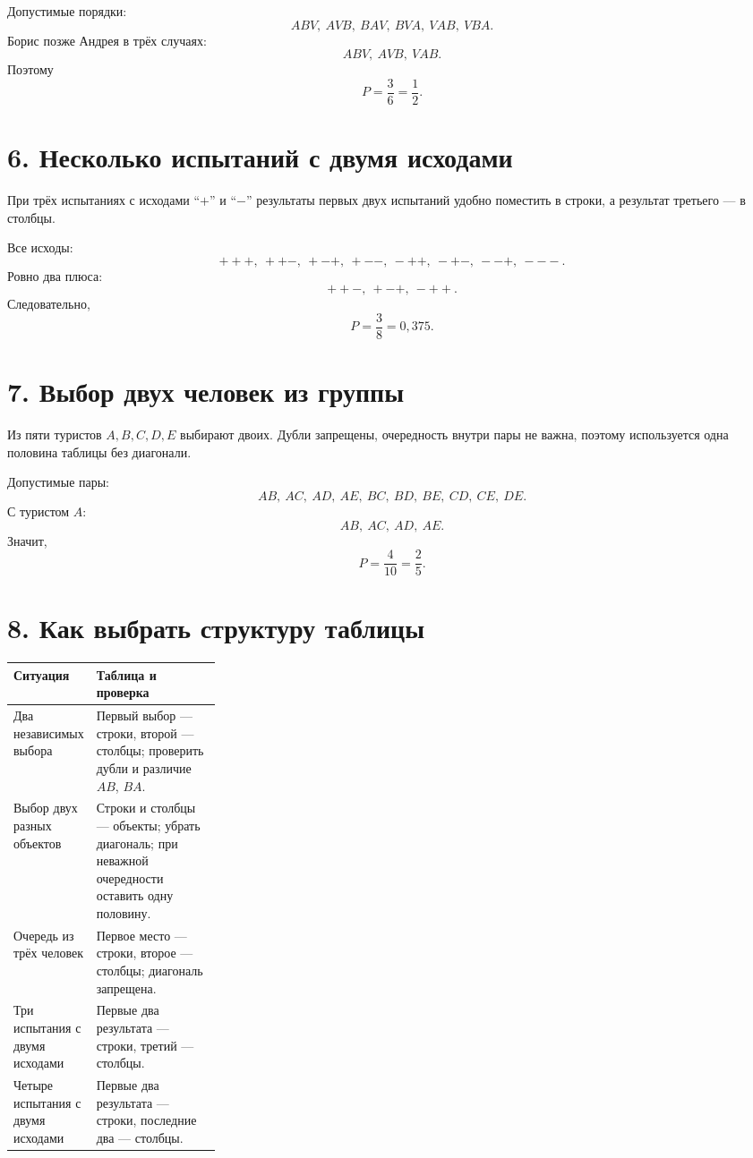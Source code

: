 \documentclass[a4paper,12pt]{article}
\begin{document}
Допустимые порядки:
\[
ABV,\ AVB,\ BAV,\ BVA,\ VAB,\ VBA.
\]
Борис позже Андрея в трёх случаях:
\[
ABV,\ AVB,\ VAB.
\]
Поэтому
\[
P=\frac36=\frac12.
\]

\section*{6. Несколько испытаний с двумя исходами}

При трёх испытаниях с исходами ``$+$'' и ``$-$'' результаты первых двух
испытаний удобно поместить в строки, а результат третьего --- в столбцы.

Все исходы:
\[
+++,\ ++-,\ +-+,\ +--,\ -++,\ -+-,\ --+,\ ---.
\]
Ровно два плюса:
\[
++-,\ +-+,\ -++.
\]
Следовательно,
\[
P=\frac38=0{,}375.
\]

\section*{7. Выбор двух человек из группы}

Из пяти туристов $A,B,C,D,E$ выбирают двоих.
Дубли запрещены, очередность внутри пары не важна, поэтому используется одна
половина таблицы без диагонали.

Допустимые пары:
\[
AB,\ AC,\ AD,\ AE,\ BC,\ BD,\ BE,\ CD,\ CE,\ DE.
\]
С туристом $A$:
\[
AB,\ AC,\ AD,\ AE.
\]
Значит,
\[
P=\frac4{10}=\frac25.
\]

\section*{8. Как выбрать структуру таблицы}

\begin{tabularx}{\linewidth}{@{}p{0.27\linewidth}X@{}}
\toprule
Ситуация & Таблица и проверка \\
\midrule
Два независимых выбора &
Первый выбор --- строки, второй --- столбцы; проверить дубли и различие $AB$, $BA$.\\
Выбор двух разных объектов &
Строки и столбцы --- объекты; убрать диагональ; при неважной очередности оставить одну половину.\\
Очередь из трёх человек &
Первое место --- строки, второе --- столбцы; диагональ запрещена.\\
Три испытания с двумя исходами &
Первые два результата --- строки, третий --- столбцы.\\
Четыре испытания с двумя исходами &
Первые два результата --- строки, последние два --- столбцы.\\
\bottomrule
\end{tabularx}
\end{document}
